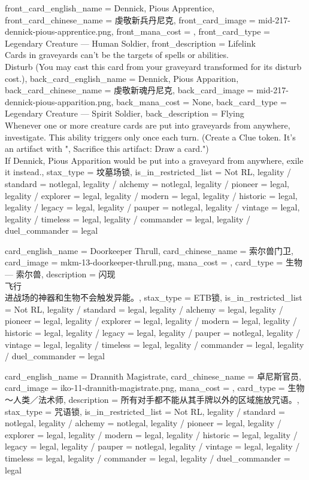 \documentclass[lang = cn, color = black, 10pt]{AllThatStax}
\begin{document}
\mfcard
{
	front_card_english_name = {Dennick, Pious Apprentice},
	front_card_chinese_name = {虔敬新兵丹尼克},
	front_card_image = mid-217-dennick-pious-apprentice.png,
	front_mana_cost = ,
	front_card_type = Legendary Creature — Human Soldier,
	front_description = {Lifelink\\
		Cards in graveyards can't be the targets of spells or abilities.\\
		Disturb  (You may cast this card from your graveyard transformed for its disturb cost.)},
	back_card_english_name = {Dennick, Pious Apparition},
	back_card_chinese_name = {虔敬新魂丹尼克},
	back_card_image = mid-217-dennick-pious-apparition.png,
	back_mana_cost = None,
	back_card_type = Legendary Creature — Spirit Soldier,
	back_description = {Flying\\
		Whenever one or more creature cards are put into graveyards from anywhere, investigate. This ability triggers only once each turn. (Create a Clue token. It's an artifact with ", Sacrifice this artifact: Draw a card.")\\
		If Dennick, Pious Apparition would be put into a graveyard from anywhere, exile it instead.},
	stax_type = 坟墓场锁,
	is_in_restricted_list = Not RL,
	legality / standard = notlegal,
	legality / alchemy = notlegal,
	legality / pioneer = legal,
	legality / explorer = legal,
	legality / modern = legal,
	legality / historic = legal,
	legality / legacy = legal,
	legality / pauper = notlegal,
	legality / vintage = legal,
	legality / timeless = legal,
	legality / commander = legal,
	legality / duel_commander = legal
}

\card
{
	card_english_name = {Doorkeeper Thrull},
	card_chinese_name = {索尔兽门卫},
	card_image = mkm-13-doorkeeper-thrull.png,
	mana_cost = ,
	card_type = 生物 — 索尔兽,
	description = {闪现\\
		飞行\\
		进战场的神器和生物不会触发异能。},
	stax_type = ETB锁,
	is_in_restricted_list = Not RL,
	legality / standard = legal,
	legality / alchemy = legal,
	legality / pioneer = legal,
	legality / explorer = legal,
	legality / modern = legal,
	legality / historic = legal,
	legality / legacy = legal,
	legality / pauper = notlegal,
	legality / vintage = legal,
	legality / timeless = legal,
	legality / commander = legal,
	legality / duel_commander = legal
}

\card
{
	card_english_name = {Drannith Magistrate},
	card_chinese_name = {卓尼斯官员},
	card_image = iko-11-drannith-magistrate.png,
	mana_cost = ,
	card_type = 生物 ～人类／法术师,
	description = {所有对手都不能从其手牌以外的区域施放咒语。},
	stax_type = 咒语锁,
	is_in_restricted_list = Not RL,
	legality / standard = notlegal,
	legality / alchemy = notlegal,
	legality / pioneer = legal,
	legality / explorer = legal,
	legality / modern = legal,
	legality / historic = legal,
	legality / legacy = legal,
	legality / pauper = notlegal,
	legality / vintage = legal,
	legality / timeless = legal,
	legality / commander = legal,
	legality / duel_commander = legal
}
\end{document}
